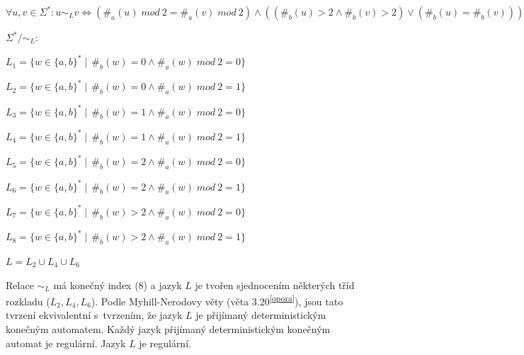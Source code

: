 \documentclass[11pt, a4paper, titlepage]{article}
\begin{document}
$\forall u, v \in \Sigma^* : u \sim_L v \Leftrightarrow (\#_a(u)\;mod \ 2 = \#_a(v)\;mod \ 2) \land ((\#_b(u) > 2 \land \#_b(v) > 2) \lor (\#_b(u) = \#_b(v)))$

\bigskip


$\Sigma^* / \sim_L$:

$L_1 = \{ w \in \{a, b\}^* \mid \, \#_b(w) = 0 \land \#_a(w) \; mod \ 2 = 0 \}$

$L_2 = \{ w \in \{a, b\}^* \mid \, \#_b(w) = 0 \land \#_a(w) \; mod \ 2 = 1 \}$

$L_3 = \{ w \in \{a, b\}^* \mid \, \#_b(w) = 1 \land \#_a(w) \; mod \ 2 = 0 \}$

$L_4 = \{ w \in \{a, b\}^* \mid \, \#_b(w) = 1 \land \#_a(w) \; mod \ 2 = 1 \}$

$L_5 = \{ w \in \{a, b\}^* \mid \, \#_b(w) = 2 \land \#_a(w) \; mod \ 2 = 0 \}$

$L_6 = \{ w \in \{a, b\}^* \mid \, \#_b(w) = 2 \land \#_a(w) \; mod \ 2 = 1 \}$

$L_7 = \{ w \in \{a, b\}^* \mid \, \#_b(w) > 2 \land \#_a(w) \; mod \ 2 = 0 \}$

$L_8 = \{ w \in \{a, b\}^* \mid \, \#_b(w) > 2 \land \#_a(w) \; mod \ 2 = 1 \}$

\bigskip


$L = L_2 \cup L_4 \cup L_6$

\bigskip


Relace $\sim_L$ má konečný index (8) a jazyk $L$ je tvořen sjednocením některých tříd rozkladu ($L_2, L_4, L_6$). Podle Myhill-Nerodovy věty (věta 3.20\textsuperscript{\ref{opora}}), jsou tato tvrzení ekvivalentní s~tvrzením, že jazyk $L$ je přijímaný deterministickým konečným automatem. Každý jazyk přijímaný deterministickým konečným automat je regulární. Jazyk $L$ je regulární.

\end{document}
